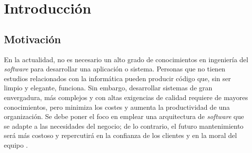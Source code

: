 \documentclass[11pt,spanish,listoffigures]{tfgetsinf}
\begin{document}
\newpage

\begin{abstract}[english]

Microservices Architectures are a latest trend where software application consists of small and autonomous services that cooperate between themselves offering several functionalities. The aim of this work is to evaluate advantages and drawbacks from an architecture based on microservices compared to a traditional or monolithic one with a study case validation. With this purpose, influence of microservices on software development process was reviewed likewise inspection of the main tools associated with its deployment.

The study case consisted of the design and implementation of a mobile application for electronic commerce purposes. The server-side was twice implemented following different architectures: one microservices-based and a monolithic one. The system deployment employed Docker containers orchestrated by Kubernetes tool within Microsoft Azure platform.

Finally, both solutions were compared in front of diverse non-functional requirements, such us availability or fault tolerance, and several maintenance situations.

\end{abstract}


\mainmatter


\chapter{Introducci\'on}

\section{Motivaci\'on}

En la actualidad, no es necesario un alto grado de conocimientos en ingeniería del \textit{software} para desarrollar una aplicación o sistema. Personas que no tienen estudios relacionados con la informática pueden producir código que, sin ser limpio y elegante, funciona. Sin embargo, desarrollar sistemas de gran envergadura, más complejos y con altas exigencias de calidad requiere de mayores conocimientos, pero minimiza los costes y aumenta la productividad de una organización. Se debe poner el foco en emplear una arquitectura de \textit{software} que se adapte a las necesidades del negocio; de lo contrario, el futuro mantenimiento será más costoso y repercutirá en la confianza de los clientes y en la moral del equipo \cite{Martin2017}.
\end{document}

